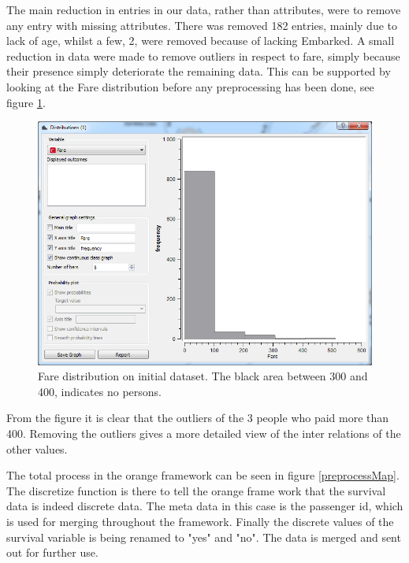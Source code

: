 \documentclass[a4paper,11pt]{article}
\begin{document}
The main reduction in entries in our data, rather than attributes, were to remove any entry with missing attributes. There was removed 182 entries, mainly due to lack of age, whilst a few, 2, were removed because of lacking Embarked. 
A small reduction in data were made to remove outliers in respect to fare, simply because their presence simply deteriorate the remaining data. This can be supported by looking at the Fare distribution before any preprocessing has been done, see figure \ref{farepreprocess}.

\begin{figure}[h]
\begin{center}
	\includegraphics[scale=0.6]{FarePreprocess}
\end{center}
\caption{Fare distribution on initial dataset. The black area between 300 and 400, indicates no persons.}
\label{farepreprocess}
\end{figure}

From the figure it is clear that the outliers of the 3 people who paid more than 400. Removing the outliers gives a more detailed view of the inter relations of the other values.

The total process in the orange framework can be seen in figure \ref{preprocessMap}. The discretize function is there to tell the orange frame work that the survival data is indeed discrete data. The meta data in this case is the passenger id, which is used for merging throughout the framework. Finally the discrete values of the survival variable is being renamed to "yes" and "no". The data is merged and sent out for further use.
\end{document}
